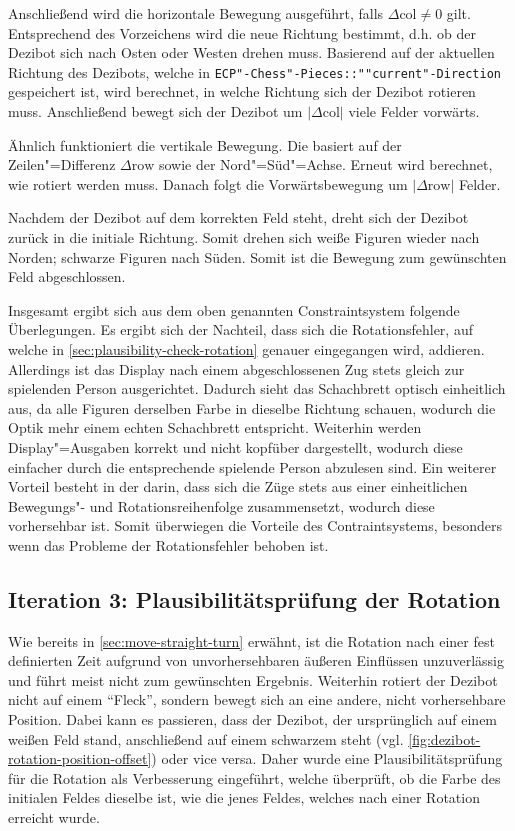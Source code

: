 Anschließend wird die horizontale Bewegung ausgeführt, falls $\Delta\text{col} \ne 0$ gilt. Entsprechend des Vorzeichens wird die neue Richtung bestimmt, d.h. ob der Dezibot sich nach Osten oder Westen drehen muss. Basierend auf der aktuellen Richtung des Dezibots, welche in \texttt{ECP"-Chess"-Pieces::""current"-Direction} gespeichert ist, wird berechnet, in welche Richtung sich der Dezibot rotieren muss. Anschließend bewegt sich der Dezibot um $\vert \Delta\text{col} \vert$ viele Felder vorwärts.

Ähnlich funktioniert die vertikale Bewegung. Die basiert auf der Zeilen"=Differenz $\Delta\text{row}$ sowie der Nord"=Süd"=Achse. Erneut wird berechnet, wie rotiert werden muss. Danach folgt die Vorwärtsbewegung um $\vert \Delta\text{row} \vert$ Felder.

Nachdem der Dezibot auf dem korrekten Feld steht, dreht sich der Dezibot zurück in die initiale Richtung. Somit drehen sich weiße Figuren wieder nach Norden; schwarze Figuren nach Süden. Somit ist die Bewegung zum gewünschten Feld abgeschlossen.


Insgesamt ergibt sich aus dem oben genannten Constraintsystem folgende Überlegungen. Es ergibt sich der Nachteil, dass sich die Rotationsfehler, auf welche in \autoref{sec:plausibility-check-rotation} genauer eingegangen wird, addieren. Allerdings ist das Display nach einem abgeschlossenen Zug stets gleich zur spielenden Person ausgerichtet. Dadurch sieht das Schachbrett optisch einheitlich aus, da alle Figuren derselben Farbe in dieselbe Richtung schauen, wodurch die Optik mehr einem echten Schachbrett entspricht. Weiterhin werden Display"=Ausgaben korrekt und nicht kopfüber dargestellt, wodurch diese einfacher durch die entsprechende spielende Person abzulesen sind. Ein weiterer Vorteil besteht in der darin, dass sich die Züge stets aus einer einheitlichen Bewegungs"- und Rotationsreihenfolge zusammensetzt, wodurch diese vorhersehbar ist. Somit überwiegen die Vorteile des Contraintsystems, besonders wenn das Probleme der Rotationsfehler behoben ist.


\subsection{Iteration 3: Plausibilitätsprüfung der Rotation}
\label{sec:plausibility-check-rotation}

Wie bereits in \autoref{sec:move-straight-turn} erwähnt, ist die Rotation nach einer fest definierten Zeit aufgrund von unvorhersehbaren äußeren Einflüssen unzuverlässig und führt meist nicht zum gewünschten Ergebnis. Weiterhin rotiert der Dezibot nicht auf einem \enquote{Fleck}, sondern bewegt sich an eine andere, nicht vorhersehbare Position. Dabei kann es passieren, dass der Dezibot, der ursprünglich auf einem weißen Feld stand, anschließend auf einem schwarzem steht (vgl. \autoref{fig:dezibot-rotation-position-offset}) oder vice versa. Daher wurde eine Plausibilitätsprüfung für die Rotation als Verbesserung eingeführt, welche überprüft, ob die Farbe des initialen Feldes dieselbe ist, wie die jenes Feldes, welches nach einer Rotation erreicht wurde.


